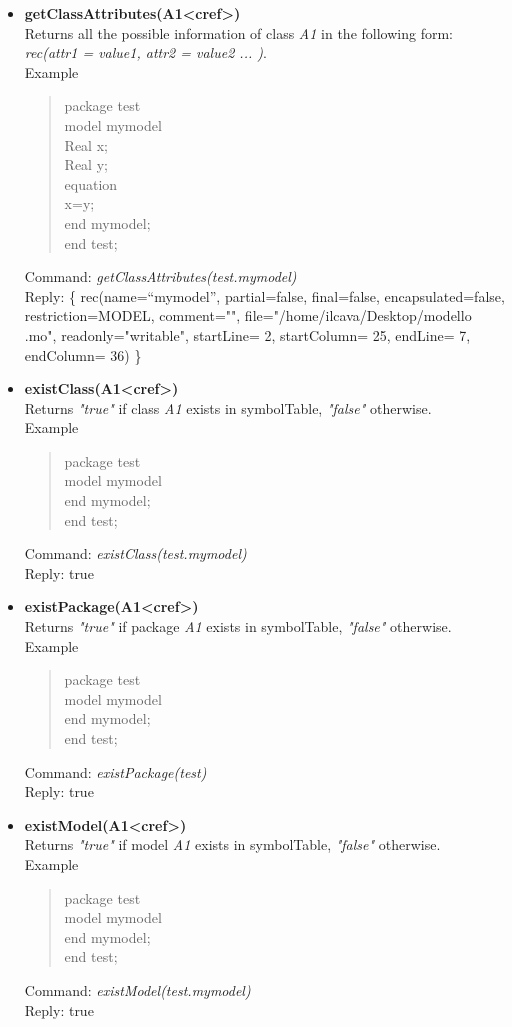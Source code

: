 \documentclass[11pt,a4paper,oneside,english]{book}
\newenvironment{modelicaExamples}{\begin{itemize}}{\end{itemize}}
\newcommand{\api}[2]{\item \textbf{#1} \\ #2}
\newcommand{\tab}{\hspace{2em}}
\newcommand{\command}[1]{Command: \textit{#1}\\}
\newcommand{\reply}[1]{Reply: #1}
\newcommand{\functionex}[2]{\begin{singlespace} \command{#1} \reply{#2} \end{singlespace}}
\newcommand{\examples}{Example}
\newenvironment{mocode}{\begin{verse}\begin{singlespace}\begin{scriptsize}\ttfamily}{\end{scriptsize}\end{singlespace}\end{verse}}
\begin{document}
\begin{modelicaExamples}
		
		\api{getClassAttributes(A1<cref>)}{Returns all the possible information of class \textit{A1} in the following form:\\ \textit{rec(attr1 = value1, attr2 = value2 ... )}.\\
		\examples
			\begin{mocode}
			package test\\
			\tab model mymodel\\
			\tab\tab	Real x;\\
			\tab\tab Real y;\\
			\tab equation\\
			\tab\tab x=y;\\
			\tab end mymodel;\\
			end test;\\
			\end{mocode}
			\functionex{getClassAttributes(test.mymodel)} 
			{\{ rec(name=``mymodel'', partial=false, final=false, encapsulated=fal\-se, restriction=MODEL, comment="", file="/home/ilcava/Desktop/modello .mo", readonly="writable", startLine= 2, startColumn= 25, endLine= 7, endColumn= 36) \}}
		}
		
		\api{existClass(A1<cref>)}{Returns \textit{"true"} if class \textit{A1} exists in symbolTable, \textit{"false"} otherwise.\\
		\examples
		\begin{mocode}
		package test\\
		\tab model mymodel\\
		\tab end mymodel;\\
		end test;\\
		\end{mocode}
		\functionex{existClass(test.mymodel)}
		{true}
		}
		
		\api{existPackage(A1<cref>)}{Returns \textit{"true"} if package \textit{A1} exists in symbolTable, \textit{"false"} otherwise.\\
		\examples
		\begin{mocode}
		package test\\
		\tab model mymodel\\
		\tab end mymodel;\\
		end test;\\
		\end{mocode}
		\functionex{existPackage(test)}
		{true}
		}
		
		\api{existModel(A1<cref>)}{Returns \textit{"true"} if model \textit{A1} exists in symbolTable, \textit{"false"} otherwise.\\
		\examples
		\begin{mocode}
		package test\\
		\tab model mymodel\\
		\tab end mymodel;\\
		end test;\\
		\end{mocode}
		\functionex{existModel(test.mymodel)}
		{true}
		}
		

\end{modelicaExamples}
\end{document}
